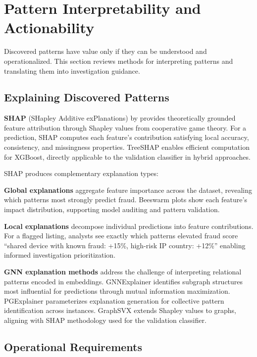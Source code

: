 \section{Pattern Interpretability and Actionability}
\label{sec:2_7}

Discovered patterns have value only if they can be understood and operationalized. This section reviews methods for interpreting patterns and translating them into investigation guidance.

\subsection{Explaining Discovered Patterns}

\textbf{SHAP} (SHapley Additive exPlanations) by \citeauthor{lundberg2017unified} \cite{lundberg2017unified} provides theoretically grounded feature attribution through Shapley values from cooperative game theory. For a prediction, SHAP computes each feature's contribution satisfying local accuracy, consistency, and missingness properties. TreeSHAP \cite{lundberg2020local} enables efficient computation for XGBoost, directly applicable to the validation classifier in hybrid approaches.

SHAP produces complementary explanation types:

\textbf{Global explanations} aggregate feature importance across the dataset, revealing which patterns most strongly predict fraud. Beeswarm plots show each feature's impact distribution, supporting model auditing and pattern validation.

\textbf{Local explanations} decompose individual predictions into feature contributions. For a flagged listing, analysts see exactly which patterns elevated fraud score ``shared device with known fraud: +15\%, high-risk IP country: +12\%'' enabling informed investigation prioritization.

\textbf{GNN explanation methods} address the challenge of interpreting relational patterns encoded in embeddings. GNNExplainer \cite{ying2019gnnexplainer} identifies subgraph structures most influential for predictions through mutual information maximization. PGExplainer \cite{luo2020parameterized} parameterizes explanation generation for collective pattern identification across instances. GraphSVX \cite{duval2021graphsvx} extends Shapley values to graphs, aligning with SHAP methodology used for the validation classifier.

\subsection{Operational Requirements}

